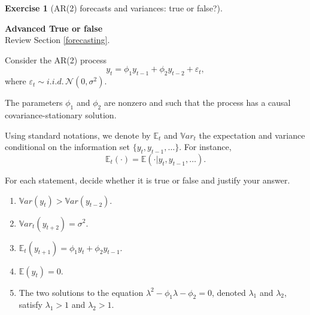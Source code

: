 \documentclass[
  11pt,
]{book}
\theoremstyle{definition}
\theoremstyle{definition}
\theoremstyle{definition}
\newtheorem{exercise}{Exercise}[chapter]
\theoremstyle{definition}
\theoremstyle{remark}
\begin{document}
\begin{exercisebox}

\begin{exercise}[AR(2) forecasts and variances: true or false?]
\protect\hypertarget{exr:time-series-ar2-true-false}{}\label{exr:time-series-ar2-true-false}

\textbf{Advanced \textbar{} True or false}\\
Review Section \ref{forecasting}.

Consider the AR(2) process \[y_t = \phi_1 y_{t-1} + \phi_2 y_{t-2} + \varepsilon_t,\] where \(\varepsilon_t \sim i.i.d.\,\mathcal{N}(0,\sigma^2)\).

The parameters \(\phi_1\) and \(\phi_2\) are nonzero and such that the process has a causal covariance-stationary solution.

Using standard notations, we denote by \(\mathbb{E}_t\) and \(\mathbb{V}ar_t\) the expectation and variance conditional on the information set \(\{y_t,y_{t-1},\dots\}\). For instance, \[\mathbb{E}_t(\cdot)=\mathbb{E}(\cdot|y_t,y_{t-1},\dots).\]

For each statement, decide whether it is true or false and justify your answer.

\begin{enumerate}
\def\labelenumi{\arabic{enumi}.}
\item
  \(\mathbb{V}ar(y_t)>\mathbb{V}ar(y_{t-2})\).
\item
  \(\mathbb{V}ar_t(y_{t+2}) = \sigma^2\).
\item
  \(\mathbb{E}_t(y_{t+1}) = \phi_1 y_t + \phi_2 y_{t-1}\).
\item
  \(\mathbb{E}(y_t)=0\).
\item
  The two solutions to the equation \(\lambda^2-\phi_1\lambda-\phi_2=0\), denoted \(\lambda_1\) and \(\lambda_2\), satisfy \(\lambda_1>1\) and \(\lambda_2>1\).
\end{enumerate}

\end{exercise}

\end{exercisebox}

\end{document}
